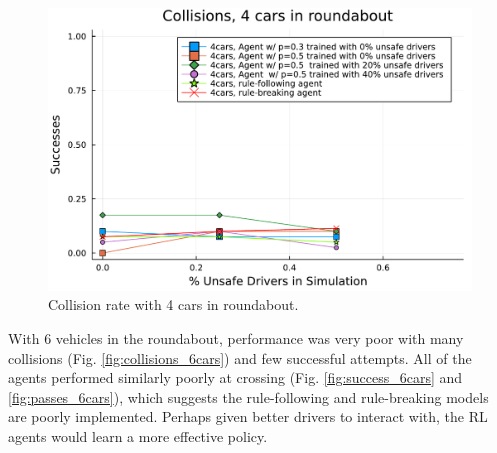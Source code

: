 \documentclass[conference]{IEEEtran}
\begin{document}
\begin{figure}[h]
	\centering
	\includegraphics[width=0.9\linewidth]{figures/collisions_3.pdf}
	\caption{Collision rate with 4 cars in roundabout.}
	\label{fig:collisions_4cars}
\end{figure}

With 6 vehicles in the roundabout, performance was very poor with many collisions (Fig. \ref{fig:collisions_6cars}) and few successful attempts. All of the agents performed similarly poorly at crossing (Fig. \ref{fig:success_6cars} and \ref{fig:passes_6cars}), which suggests the rule-following and rule-breaking models are poorly implemented. Perhaps given better drivers to interact with, the RL agents would learn a more effective policy.
\end{document}
